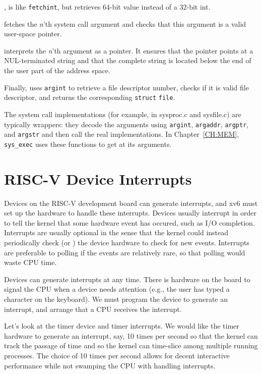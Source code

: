 ,
is like
\lstinline{fetchint},
but retrieves 64-bit value instead of a 32-bit int.

fetches the
\textit{n}'th 
system call argument and checks that this argument is a valid
user-space pointer.

interprets the
\textit{n}'th 
argument as a pointer.  It ensures that the pointer points at a
NUL-terminated string and that the complete string is located below
the end of the user part of the address space.

Finally,
uses
\lstinline{argint}
to retrieve a file descriptor number, checks if it is valid
file descriptor, and returns the corresponding
\lstinline{struct}
\lstinline{file}.

The system call implementations (for example, in sysproc.c and sysfile.c)
are typically wrappers: they decode the arguments using 
\lstinline{argint},
\lstinline{argaddr},
\lstinline{argptr}, 
and 
\lstinline{argstr}
and then call the real implementations.
In Chapter~\ref{CH:MEM},
\lstinline{sys_exec}
uses these functions to get at its arguments.

\section{RISC-V Device Interrupts}

Devices on the RISC-V development board can generate interrupts, and
xv6 must set up the hardware to handle these interrupts.  Devices
usually interrupt in order to tell the kernel that some hardware event
has occured, such as I/O completion.  Interrupts are usually optional
in the sense that the kernel could instead periodically check (or
) the device hardware to check for new
events.  Interrupts are preferable to polling if the events are
relatively rare, so that polling would waste CPU time.

Devices can generate interrupts
at any time.  There is hardware on the board to signal the CPU
when a device needs attention (e.g., the user has typed a character on
the keyboard). We must program the device to generate an interrupt, and
arrange that a CPU receives the interrupt. 

Let's look at the timer device and timer interrupts.  We would like
the timer hardware to generate an interrupt, say, 10 times per
second so that the kernel can track the passage of time and so the
kernel can time-slice among multiple running processes.  The choice of
10 times per second allows for decent interactive performance while
not swamping the CPU with handling interrupts.

